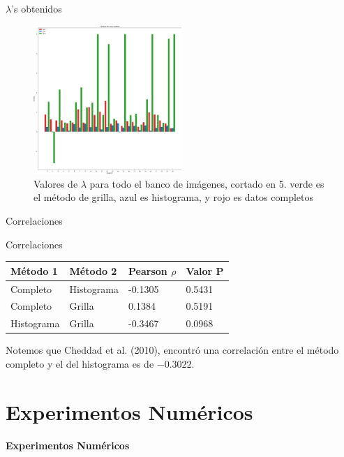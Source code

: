 \documentclass{beamer}
\begin{document}
\begin{frame}{$\lambda$'s obtenidos}
    \begin{figure}[H]
        \centering
        \includegraphics[width=0.5\textwidth]{lambda_clip.png}
        \caption{Valores de $\lambda$ para todo el banco de im\'agenes, cortado en 5. verde es el m\'etodo de grilla, azul es histograma, y rojo es datos completos}
        \label{fig:lambda_clip}
    \end{figure}
\end{frame}


\begin{frame}{Correlaciones}
    \begin{block}{Correlaciones}
        \begin{table}[H]
            \centering
            \begin{tabular}{|l|l|l|l|}
                \hline
                M\'etodo 1 & M\'etodo 2 & Pearson $\rho$ & Valor P \\ \hline
                Completo                  & Histograma                & -0.1305   & 0.5431  \\ 
                Completo                  & Grilla                    & 0.1384    & 0.5191  \\ 
                Histograma                & Grilla                    & -0.3467   & 0.0968  \\ \hline
            \end{tabular}
        \end{table}
    \end{block}
    Notemos que Cheddad et al. (2010), encontró una correlación entre el método completo y el del histograma es de $-0.3022$.
\end{frame}



\section{Experimentos Numéricos}
\begin{frame}
    \begin{center}
        {\LARGE\bf Experimentos Numéricos}
    \end{center}
\end{frame}
\end{document}
